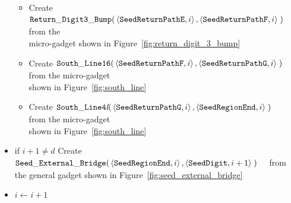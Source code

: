 \begin{itemize}
\begin{itemize}
        \item Create
        $\begin{aligned}[t]
            {\tt Return\_Digit3\_Bump}(&\left\langle {\tt SeedReturnPathE}, i \right\rangle,
                                        \left\langle {\tt SeedReturnPathF}, i \right\rangle \;)
        \end{aligned}$ from the\\micro-gadget shown in Figure~\ref{fig:return_digit_3_bump}

        \item Create
        $\begin{aligned}[t]
            {\tt South\_Line16}(&\left\langle {\tt SeedReturnPathF}, i \right\rangle,
                                 \left\langle {\tt SeedReturnPathG}, i \right\rangle \;)
        \end{aligned}$ from the micro-gadget\\shown in Figure~\ref{fig:south_line}

        \item Create
        $\begin{aligned}[t]
            {\tt South\_Line4\textit{l}}(&\left\langle {\tt SeedReturnPathG}, i \right\rangle,
                                          \left\langle {\tt SeedRegionEnd},   i \right\rangle \;)
        \end{aligned}$ from the micro-gadget\\shown in Figure~\ref{fig:south_line}
    \end{itemize}

    \item if $i + 1\not=d$ Create
    $\begin{aligned}[t]
        {\tt Seed\_External\_Bridge}(&\left\langle {\tt SeedRegionEnd}, i \right\rangle,
                                      \left\langle {\tt SeedDigit}, i + 1\right\rangle \;)
    \end{aligned}$ from the general gadget shown in Figure~\ref{fig:seed_external_bridge}

    \item $i \gets i + 1$

\end{itemize}


